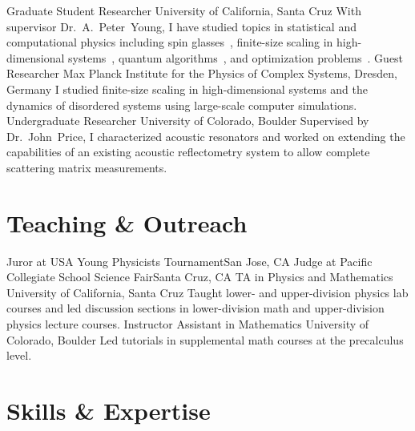 \documentclass{cv}
\def\Peter{Dr.~A.~Peter~Young}
\def\John{Dr.~John~Price}
\begin{document}
\begin{cvjobs}
    {Graduate Student Researcher}
    {University of California, Santa Cruz}
    {With supervisor \Peter, I have studied topics in statistical and
     computational physics including
     spin glasses~\cite{wittmann2012spin, wittmann2013low, wittmann2014low},
     finite-size scaling in high-dimensional systems~\cite{wittmann2014finite},
     quantum algorithms~\cite{wittmann2014distinguishing},
     and optimization problems~\cite{wittmann2014scheduling}.}
    {Guest Researcher}
    {Max Planck Institute for the Physics of Complex Systems, Dresden, Germany}
    {I studied finite-size scaling in high-dimensional systems and the
     dynamics of disordered systems using large-scale computer simulations.}
    {Undergraduate Researcher}
    {University of Colorado, Boulder}
    {Supervised by \John{}, I characterized acoustic resonators and worked on
     extending the capabilities of an existing acoustic reflectometry system to
     allow complete scattering matrix measurements.}
\end{cvjobs}

\section{Teaching \& Outreach}

\begin{cvjobs}
    {Juror at USA Young Physicists Tournament}{San Jose, CA}{}
  \cvjob{}{}
    {Judge at Pacific Collegiate School Science Fair}{Santa Cruz, CA}{}
    {TA in Physics and Mathematics}
    {University of California, Santa Cruz}
    {Taught lower- and upper-division physics lab courses and led discussion sections in
     lower-division math and upper-division physics lecture courses.}
    {Instructor Assistant in Mathematics}
    {University of Colorado, Boulder}
    {Led tutorials in supplemental math courses at the precalculus level.}
\end{cvjobs}

\section{Skills \& Expertise}
\end{document}
